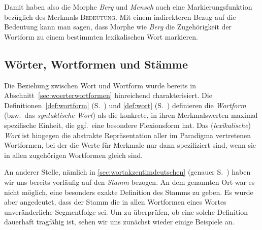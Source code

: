 \begin{exe}
  \ex\label{ex:morph0815}
  \begin{xlist}
  \end{xlist}
\end{exe}

Damit haben also die Morphe \textit{Berg} und \textit{Mensch} auch eine Markierungsfunktion bezüglich des Merkmals \textsc{Bedeutung}.
Mit einem indirekteren Bezug auf die Bedeutung kann man sagen, dass Morphe wie \textit{Berg} die Zugehörigkeit der Wortform zu einem bestimmten lexikalischen Wort markieren.

\subsection{Wörter, Wortformen und Stämme}

\label{sec:stamm}


Die Beziehung zwischen Wort und Wortform wurde bereits in Abschnitt~\ref{sec:woerterwortformen} hinreichend charakterisiert.
Die Definitionen~\ref{def:wortform} (S.~\pageref{def:wortform}) und \ref{def:wort} (S.~\pageref{def:wort}) definieren die \textit{Wortform} (bzw.\ das \textit{syntaktische Wort}) als die konkrete, in ihren Merkmalswerten maximal spezifische Einheit, die ggf.\ eine besondere Flexionsform hat.
Das (\textit{lexikalische}) \textit{Wort} ist hingegen die abstrakte Repräsentation aller im Paradigma vertretenen Wortformen, bei der die Werte für Merkmale nur dann spezifiziert sind, wenn sie in allen zugehörigen Wortformen gleich sind.

An anderer Stelle, nämlich in \ref{sec:wortakzentimdeutschen} (genauer S.~\pageref{abs:3453457}) haben wir uns bereits vorläufig auf den \textit{Stamm} bezogen.
An dem genannten Ort war es nicht möglich, eine besonders exakte Definition des Stamms zu geben.
Es wurde aber angedeutet, dass der Stamm die in allen Wortformen eines Wortes unveränderliche Segmentfolge sei.
Um zu überprüfen, ob eine solche Definition dauerhaft tragfähig ist, sehen wir uns zunächst wieder einige Beispiele an.

